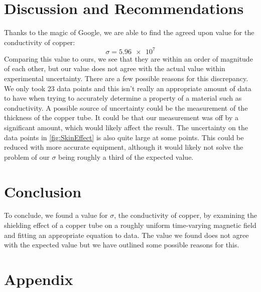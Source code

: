 \documentclass[12pt]{article}
\numberwithin{equation}{section}
\numberwithin{figure}{section}
\begin{document}
    \section{Discussion and Recommendations}\label{sec:DiscussionRecommendations}
    Thanks to the magic of Google, we are able to find the agreed upon value for the conductivity 
    of copper:
    \begin{equation*}
        \sigma=\num{5.96e7}
    \end{equation*}
    Comparing this value to ours, we see that they are within an order of magnitude of each other, 
    but our value does not agree with the actual value within experimental uncertainty. There 
    are a few possible reasons for this discrepancy. We only took 23 data points and this isn't 
    really an appropriate amount of data to have when trying to accurately determine a property 
    of a material such as conductivity. A possible source of uncertainty could be the measurement 
    of the thickness of the copper tube. It could be that our measurement was off by a significant 
    amount, which would likely affect the result. The uncertainty on the data points in \autoref{fig:SkinEffect} 
    is also quite large at some points. This could be reduced with more accurate equipment, although 
    it would likely not solve the problem of our $\sigma$ being roughly a third of the expected 
    value. 

    \section{Conclusion}\label{sec:Conclusion}
    To conclude, we found a value for $\sigma$, the conductivity of copper, by examining the 
    shielding effect of a copper tube on a roughly uniform time-varying magnetic field and 
    fitting an appropriate equation to data. The value we found does not agree with the 
    expected value but we have outlined some possible reasons for this. 
    
    \newpage
    \section{Appendix}\label{sec:Appendix}
    \setcounter{figure}{0} \renewcommand{\thefigure}{A.\arabic{figure}}
    
    
\end{document}
